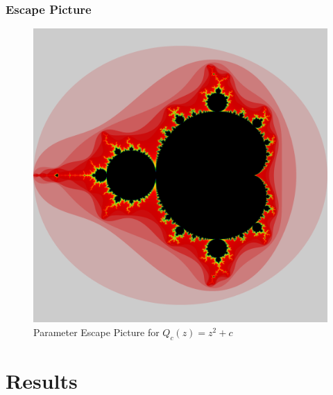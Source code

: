 \documentclass{beamer}
\newcommand{\<}{\left\langle}
\renewcommand{\>}{\right\rangle} %
\renewcommand{\*}{\cdot} %
\begin{document}
\begin{frame}
	\frametitle{Escape Picture}
	\begin{figure}
		\includegraphics[height=.75\textheight]{./img/b000.png}
		\caption{Parameter Escape Picture for $Q_c (z) = z^2 + c$}
	\end{figure}
\end{frame}
\section{Results}
\end{document}
